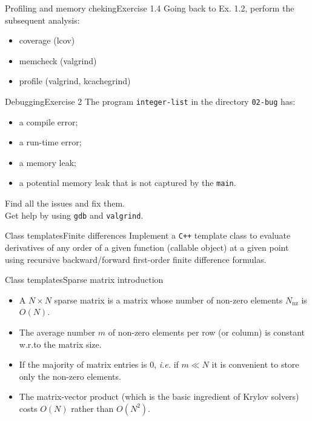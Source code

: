 \documentclass[9pt]{beamer}
\begin{document}
\begin{frame}{Profiling and memory cheking}{Exercise 1.4}
Going back to Ex. 1.2, perform the subsequent analysis:
\begin{itemize}
\item coverage ({\ttfamily lcov})
\item memcheck ({\ttfamily valgrind})
\item profile ({\ttfamily valgrind, kcachegrind})
\end{itemize}
\end{frame}

\begin{frame}{Debugging}{Exercise 2}
The program \texttt{integer-list} in the directory \texttt{02-bug} has:

\begin{itemize}
    \item a compile error;
    \item a run-time error;
    \item a memory leak;
    \item a potential memory leak that is not captured by the \texttt{main}.
\end{itemize}
\vspace{0.5cm}
Find all the issues and fix them. \\[3mm]

Get help by using \texttt{gdb} and \texttt{valgrind}.\\[3mm]
\end{frame}

\begin{frame}[fragile]{Class templates}{Finite differences}
Implement a \texttt{C++} template class to evaluate derivatives of any order of a given function (callable object) at a given point using recursive backward/forward first-order finite difference formulas.
\end{frame}

\begin{frame}{Class templates}{Sparse matrix introduction}
\begin{itemize}
\item A $N \times N$ sparse matrix is a matrix whose number of non-zero elements $N_\mathrm{nz}$ is $O(N)$. \\[3mm]
\item The average number $m$ of non-zero elements per row (or column)
is constant w.r.to the matrix size. \\[3mm]
\item If the majority of matrix entries is $0$, {\it i.e.} if $m \ll N$ it is convenient to store only the non-zero elements.\\[3mm]
\item The matrix-vector product (which is the basic ingredient of Krylov solvers) costs $O(N)$ rather than $O(N^{2})$.\\[3mm]
\end{itemize}
\end{frame}
\end{document}
